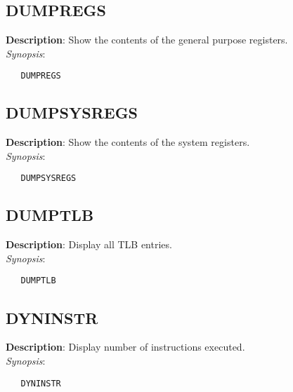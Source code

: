 \subsection{\bf DUMPREGS}
\label{manpages:DUMPREGS}
\label{manpages:dumpregs}
\vspace{-0.2in}
{\bf Description}: 	Show the contents of the general purpose registers.\\[1.5ex]
{\em Synopsis}:
\vspace{-0.2in}
\scriptsize
\begin{verbatim}
   DUMPREGS   		
\end{verbatim}
\normalsize
\vspace{-0.2in}


\subsection{\bf DUMPSYSREGS}
\label{manpages:DUMPSYSREGS}
\label{manpages:dumpsysregs}
\vspace{-0.2in}
{\bf Description}: 	Show the contents of the system registers.\\[1.5ex]
{\em Synopsis}:
\vspace{-0.2in}
\scriptsize
\begin{verbatim}
   DUMPSYSREGS   				
\end{verbatim}
\normalsize
\vspace{-0.2in}


\subsection{\bf DUMPTLB}
\label{manpages:DUMPTLB}
\label{manpages:dumptlb}
\vspace{-0.2in}
{\bf Description}: 	Display all TLB entries.\\[1.5ex]
{\em Synopsis}:
\vspace{-0.2in}
\scriptsize
\begin{verbatim}
   DUMPTLB    
\end{verbatim}
\normalsize
\vspace{-0.2in}


\subsection{\bf DYNINSTR}
\label{manpages:DYNINSTR}
\label{manpages:dyninstr}
\vspace{-0.2in}
{\bf Description}: 	Display number of instructions executed.\\[1.5ex]
{\em Synopsis}:
\vspace{-0.2in}
\scriptsize
\begin{verbatim}
   DYNINSTR   				
\end{verbatim}
\normalsize
\vspace{-0.2in}


